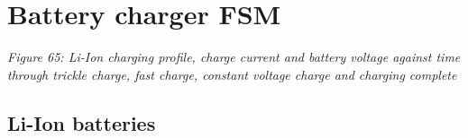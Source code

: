 \begin{Shaded}
\begin{Highlighting}[]
\OperatorTok{(}
               \OperatorTok{[}\OperatorTok{:}\OperatorTok{]}\OperatorTok{,}
               \OperatorTok{,}
               \OperatorTok{);}
   \OperatorTok{=} \OperatorTok{;}
\OperatorTok{[}\OperatorTok{:}\OperatorTok{]}\OperatorTok{;}
   
\OperatorTok{=}\OperatorTok{+} \OperatorTok{;}

 \OperatorTok{)} 
       \OperatorTok{(}\OperatorTok{)}
\OperatorTok{\textless{}=} \OperatorTok{;}
\OperatorTok{\textless{}=}\OperatorTok{;}

 
\end{Highlighting}
\end{Shaded}

\section{Battery charger FSM}\label{battery-charger-fsm}


{
\centering
{}
}

\emph{Figure 65: Li-Ion charging profile, charge current and battery
voltage against time through trickle charge, fast charge, constant
voltage charge and charging complete}

\subsection{Li-Ion batteries}\label{li-ion-batteries}

